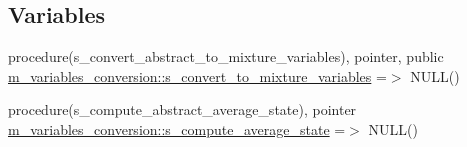 \subsection*{Variables}
\begin{DoxyCompactItemize}
\item 
procedure(s\+\_\+convert\+\_\+abstract\+\_\+to\+\_\+mixture\+\_\+variables), pointer, public \hyperlink{namespacem__variables__conversion_a2f790d774fdcc87779b89a71ae3f2674}{m\+\_\+variables\+\_\+conversion\+::s\+\_\+convert\+\_\+to\+\_\+mixture\+\_\+variables} =$>$ N\+U\+LL()
\item 
procedure(s\+\_\+compute\+\_\+abstract\+\_\+average\+\_\+state), pointer \hyperlink{namespacem__variables__conversion_a2071f3e7e4336e3e87f259e72ccdb8b1}{m\+\_\+variables\+\_\+conversion\+::s\+\_\+compute\+\_\+average\+\_\+state} =$>$ N\+U\+LL()
\end{DoxyCompactItemize}
